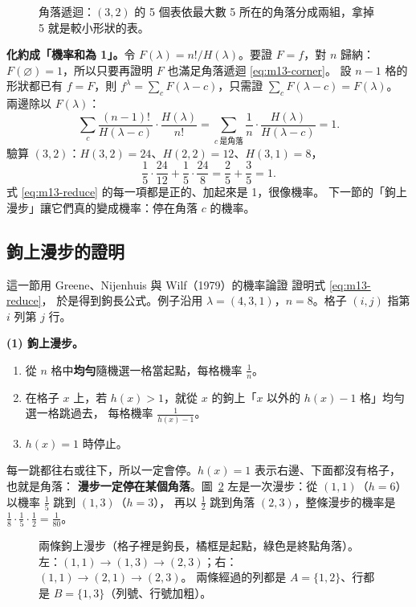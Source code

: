 \begin{figure}[H]
\centering
\FigMXIIICorner
\caption{角落遞迴：$(3,2)$ 的 5 個表依最大數 5 所在的\textcolor{cC}{角落}分成兩組，拿掉 5 就是較小形狀的表。}
\label{fig:m13-corner}
\end{figure}

\textbf{化約成「機率和為 1」。}令 $F(\lambda)=n!/H(\lambda)$。要證 $F=f$，對 $n$ 歸納：
$F(\varnothing)=1$，所以只要再證明 $F$ 也滿足角落遞迴 \eqref{eq:m13-corner}。
設 $n-1$ 格的形狀都已有 $f=F$，則 $f^{\lambda}=\sum_c F(\lambda-c)$，只需證 $\sum_c F(\lambda-c)=F(\lambda)$。
兩邊除以 $F(\lambda)$：
\begin{equation}\label{eq:m13-reduce}
\sum_{c}\frac{(n-1)!}{H(\lambda-c)}\cdot\frac{H(\lambda)}{n!}
=\sum_{c\ \text{是角落}}\frac{1}{n}\cdot\frac{H(\lambda)}{H(\lambda-c)}=1 .
\end{equation}
驗算 $(3,2)$：$H(3,2)=24$、$H(2,2)=12$、$H(3,1)=8$，
\[
\frac15\cdot\frac{24}{12}+\frac15\cdot\frac{24}{8}=\frac25+\frac35=1 .
\]
式 \eqref{eq:m13-reduce} 的每一項都是正的、加起來是 1，很像機率。
下一節的「鉤上漫步」讓它們真的變成機率：停在角落 $c$ 的機率。

\subsection{鉤上漫步的證明}\label{sec:m14}

這一節用 Greene、Nijenhuis 與 Wilf（1979）的機率論證  證明式 \eqref{eq:m13-reduce}，
於是得到鉤長公式。例子沿用 $\lambda=(4,3,1)$，$n=8$。格子 $(i,j)$ 指第 $i$ 列第 $j$ 行。

\textbf{(1) 鉤上漫步。}
\begin{enumerate}[leftmargin=1.6em]
  \item 從 $n$ 格中\textbf{均勻}隨機選一格當起點，每格機率 $\frac1n$。
  \item 在格子 $x$ 上，若 $h(x)>1$，就從 $x$ 的鉤上「$x$ 以外的 $h(x)-1$ 格」均勻選一格跳過去，
        每格機率 $\frac{1}{h(x)-1}$。
  \item $h(x)=1$ 時停止。
\end{enumerate}
每一跳都往右或往下，所以一定會停。$h(x)=1$ 表示右邊、下面都沒有格子，也就是角落：
\textbf{漫步一定停在某個角落}。圖~\ref{fig:m14-walks} 左是一次漫步：從 $(1,1)$（$h=6$）以機率 $\frac15$ 跳到 $(1,3)$（$h=3$），
再以 $\frac12$ 跳到角落 $(2,3)$，整條漫步的機率是 $\frac18\cdot\frac15\cdot\frac12=\frac1{80}$。

\begin{figure}[H]
\centering
\FigMXIVWalks
\caption{兩條鉤上漫步（格子裡是鉤長，\textcolor{cTop}{橘框}是起點，\textcolor{cC}{綠色}是終點角落）。
左：$(1,1)\to(1,3)\to(2,3)$；右：$(1,1)\to(2,1)\to(2,3)$。
兩條經過的列都是 \textcolor{cLeft}{$A=\{1,2\}$}、行都是 \textcolor{cRight}{$B=\{1,3\}$}（列號、行號加粗）。}
\label{fig:m14-walks}
\end{figure}

